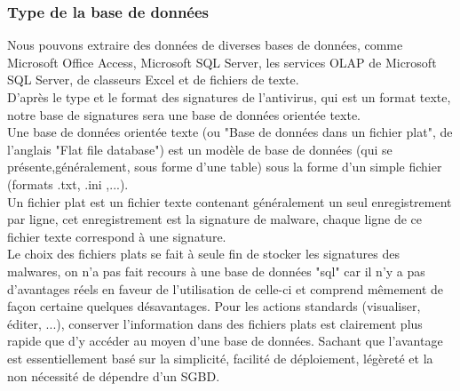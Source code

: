\subsubsection{Type de la base de données}
Nous pouvons extraire des données de diverses bases de données, comme Microsoft Office Access, Microsoft SQL Server, les services OLAP de Microsoft SQL Server, de classeurs Excel et de fichiers de texte.\\


D'après le type et le format des signatures de l'antivirus, qui est un format texte, notre base de signatures sera une base de données orientée texte.\\

Une base de données orientée texte (ou "Base de données dans un fichier plat", de l'anglais "Flat file database") est un modèle de base de données (qui se présente,généralement, sous forme d'une table) sous la forme d'un simple fichier (formats .txt, .ini ,...).\\


Un fichier plat est un fichier texte contenant généralement un seul enregistrement par ligne, cet enregistrement est la signature de malware, chaque ligne de ce fichier texte correspond à une signature.\\

Le choix des fichiers plats se fait à seule fin de stocker les signatures des malwares, on n'a pas fait recours à une base de données "sql" car il n'y a pas d'avantages réels en faveur de l'utilisation de celle-ci et comprend mêmement de façon certaine quelques désavantages. Pour les actions standards (visualiser, éditer, ...), conserver l'information dans des fichiers plats est clairement plus rapide que d'y accéder au moyen d'une base de données. Sachant que l'avantage est essentiellement basé sur la simplicité, facilité de déploiement, légèreté et la non nécessité de dépendre d'un SGBD.
